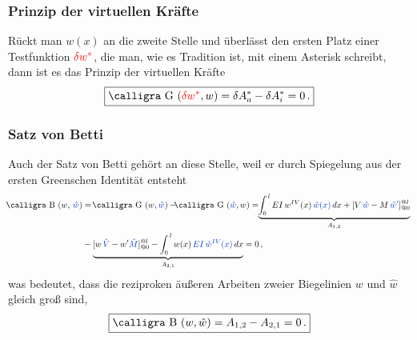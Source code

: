 {{{{{\textcolor{sectionTitleBlue}{\subsubsection*{Prinzip der virtuellen Kr\"{a}fte}}}

R\"{u}ckt man $w(x) $ an die zweite Stelle und \"{u}berl\"{a}sst den ersten Platz einer Testfunktion $\textcolor{red}{\delta w^*} $, die man, wie es Tradition ist, mit einem Asterisk schreibt, dann ist es das Prinzip der virtuellen Kr\"{a}fte
\begin{align}
\boxed{\text{\normalfont\calligra G\,\,}(\textcolor{red}{\delta w^*},w) = \delta A_a^* - \delta A_i^* = 0\,.}
\end{align}
{\textcolor{sectionTitleBlue}{\subsubsection*{Satz von Betti}}}
Auch der Satz von Betti geh\"{o}rt an diese Stelle, weil er durch Spiegelung aus der ersten Greenschen Identit\"{a}t entsteht
\begin{align}
\!\!\text{\normalfont\calligra B\,\,}(w,\,\textcolor{chapterTitleBlue}{\hat{w}}) &= \!\text{\normalfont\calligra G\,\,}(w,\textcolor{chapterTitleBlue}{\hat{w}}) - \!\!\! \text{\normalfont\calligra G\,\,}(\textcolor{chapterTitleBlue}{\hat{w}}, w)  = \!\!\underbrace{\int_0^{\,l} EI\,w^{IV}(x)\,\textcolor{chapterTitleBlue}{\hat{w}(x)}\,dx + [V\,\textcolor{chapterTitleBlue}{\hat{w}} - M\,\textcolor{chapterTitleBlue}{\hat{w}'}]_{@0}^{@l}}_{A_{1,2}}\nn \\
& - \underbrace{[w\,\textcolor{chapterTitleBlue}{\hat{V}}- w' \textcolor{chapterTitleBlue}{\hat{M}}]_{@0}^{@l}  - \int_0^{\,l} w(x)\,\textcolor{chapterTitleBlue}{EI\,\hat{w}^{IV}(x)}\,dx}_{A_{2,1}}= 0\,,
\end{align}
was bedeutet, dass die reziproken \"{a}u{\ss}eren Arbeiten zweier Biegelinien $w $ und $\hat{w} $ gleich gro{\ss} sind, $$\boxed{\text{\normalfont\calligra B\,\,}(w,\hat{w}) = A_{1,2} - A_{2,1} = 0\,.}$$

}}}}
